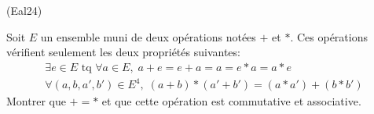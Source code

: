 \begin{tiny}(Eal24)\end{tiny} Soit $E$ un ensemble muni de deux opérations notées $+$ et $*$. Ces opérations vérifient seulement les deux propriétés suivantes:
\begin{align*}
  \exists e \in E \text{ tq } \forall a \in E, \; a + e = e + a = a = e * a = a*e \\
  \forall (a,b,a',b')\in E^4, \; (a + b) * (a' + b') = (a*a') + (b*b')
\end{align*}
Montrer que $ + = *$ et que cette opération est commutative et associative.